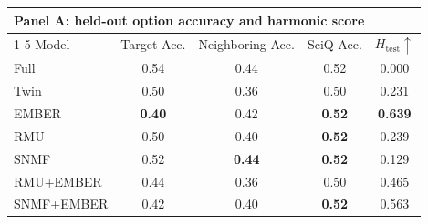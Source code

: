 \begin{table}[t]
  \centering
  \scriptsize
  \begin{tabular}{lcccc}
    \toprule
    \multicolumn{5}{l}{\textbf{Panel A: held-out option accuracy and harmonic score}} \\
    \cmidrule(lr){1-5}
    Model & Target Acc. & Neighboring Acc. & SciQ Acc. & $H_{\mathrm{test}}\uparrow$ \\
    \midrule
    Full  & 0.54 & 0.44 & 0.52 & 0.000 \\
    Twin  & 0.50 & 0.36 & 0.50 & 0.231 \\
    EMBER & \textbf{0.40} & 0.42 & \textbf{0.52} & \textbf{0.639} \\
    RMU   & 0.50 & 0.40 & \textbf{0.52} & 0.239 \\
    SNMF  & 0.52 & \textbf{0.44} & \textbf{0.52} & 0.129 \\
    RMU+EMBER & 0.44 & 0.36 & 0.50 & 0.465 \\
    SNMF+EMBER & 0.42 & 0.40 & \textbf{0.52} & 0.563 \\
    \bottomrule
  \end{tabular}


\end{table}
